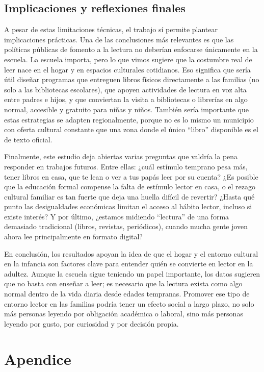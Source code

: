 \documentclass[aps,reprint]{revtex4-2}
\begin{document}
\subsection*{Implicaciones y reflexiones finales}

A pesar de estas limitaciones técnicas, el trabajo sí permite plantear implicaciones prácticas. Una de las conclusiones más relevantes es que las políticas públicas de fomento a la lectura no deberían enfocarse únicamente en la escuela. La escuela importa, pero lo que vimos sugiere que la costumbre real de leer nace en el hogar y en espacios culturales cotidianos. Eso significa que sería útil diseñar programas que entreguen libros físicos directamente a las familias (no solo a las bibliotecas escolares), que apoyen actividades de lectura en voz alta entre padres e hijos, y que conviertan la visita a bibliotecas o librerías en algo normal, accesible y gratuito para niñas y niños. También sería importante que estas estrategias se adapten regionalmente, porque no es lo mismo un municipio con oferta cultural constante que una zona donde el único “libro” disponible es el de texto oficial.

Finalmente, este estudio deja abiertas varias preguntas que valdría la pena responder en trabajos futuros. Entre ellas: ¿cuál estímulo temprano pesa más, tener libros en casa, que te lean o ver a tus papás leer por su cuenta? ¿Es posible que la educación formal compense la falta de estímulo lector en casa, o el rezago cultural familiar es tan fuerte que deja una huella difícil de revertir? ¿Hasta qué punto las desigualdades económicas limitan el acceso al hábito lector, incluso si existe interés? Y por último, ¿estamos midiendo “lectura” de una forma demasiado tradicional (libros, revistas, periódicos), cuando mucha gente joven ahora lee principalmente en formato digital?

En conclusión, los resultados apoyan la idea de que el hogar y el entorno cultural en la infancia son factores clave para entender quién se convierte en lector en la adultez. Aunque la escuela sigue teniendo un papel importante, los datos sugieren que no basta con enseñar a leer; es necesario que la lectura exista como algo normal dentro de la vida diaria desde edades tempranas. Promover ese tipo de entorno lector en las familias podría tener un efecto social a largo plazo, no solo más personas leyendo por obligación académica o laboral, sino más personas leyendo por gusto, por curiosidad y por decisión propia.

\section{Apendice}
\appendix
\end{document}
